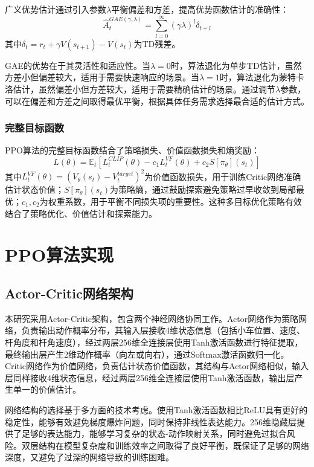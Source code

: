 \documentclass[12pt,a4paper]{article}
\begin{document}
广义优势估计通过引入参数$\lambda$平衡偏差和方差，提高优势函数估计的准确性：
\begin{equation}
    \hat{A}_t^{GAE(\gamma, \lambda)} = \sum_{l=0}^{\infty} (\gamma \lambda)^l \delta_{t+l}
\end{equation}
其中$\delta_t = r_t + \gamma V(s_{t+1}) - V(s_t)$为TD残差。

GAE的优势在于其灵活性和适应性。当$\lambda=0$时，算法退化为单步TD估计，虽然方差小但偏差较大，适用于需要快速响应的场景。当$\lambda=1$时，算法退化为蒙特卡洛估计，虽然偏差小但方差较大，适用于需要精确估计的场景。通过调节$\lambda$参数，可以在偏差和方差之间取得最优平衡，根据具体任务需求选择最合适的估计方式。

\subsubsection{完整目标函数}

PPO算法的完整目标函数结合了策略损失、价值函数损失和熵奖励：
\begin{equation}
    L(\theta) = \mathbb{E}_t \left[ L_t^{CLIP}(\theta) - c_1 L_t^{VF}(\theta) + c_2 S[\pi_\theta](s_t) \right]
\end{equation}
其中$L_t^{VF}(\theta) = (V_\theta(s_t) - V_t^{target})^2$为价值函数损失，用于训练Critic网络准确估计状态价值；$S[\pi_\theta](s_t)$为策略熵，通过鼓励探索避免策略过早收敛到局部最优；$c_1, c_2$为权重系数，用于平衡不同损失项的重要性。这种多目标优化策略有效结合了策略优化、价值估计和探索能力。

\section{PPO算法实现}

\subsection{Actor-Critic网络架构}

本研究采用Actor-Critic架构，包含两个神经网络协同工作。Actor网络作为策略网络，负责输出动作概率分布，其输入层接收4维状态信息（包括小车位置、速度、杆角度和杆角速度），经过两层256维全连接层使用Tanh激活函数进行特征提取，最终输出层产生2维动作概率（向左或向右），通过Softmax激活函数归一化。Critic网络作为价值网络，负责估计状态价值函数，其结构与Actor网络相似，输入层同样接收4维状态信息，经过两层256维全连接层使用Tanh激活函数，输出层产生单一的价值估计。

网络结构的选择基于多方面的技术考虑。使用Tanh激活函数相比ReLU具有更好的稳定性，能够有效避免梯度爆炸问题，同时保持非线性表达能力。256维隐藏层提供了足够的表达能力，能够学习复杂的状态-动作映射关系，同时避免过拟合风险。双层结构在模型复杂度和训练效率之间取得了良好平衡，既保证了足够的网络深度，又避免了过深的网络导致的训练困难。
\end{document}

